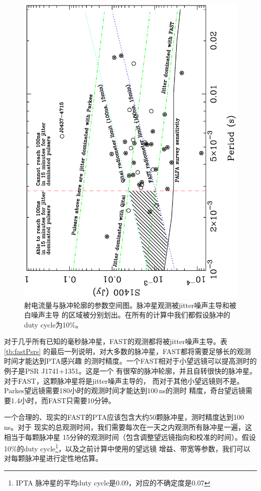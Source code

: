 \begin{figure}
\begin{center}
\includegraphics[angle=-90,width=12cm]{fastPsrsSelect.ps}
\caption{射电流量与脉冲轮廓的参数空间图。脉冲星观测被jitter噪声主导和被白噪声主导
的区域被分别划出。在所有的计算中我们都假设脉冲的duty cycle为10\%。} \label{fg:fastPsrsSelect}
\end{center}
\end{figure}

对于几乎所有已知的毫秒脉冲星，FAST的观测都将被jitter噪声主导。表\ref{tb:fastPsrs}
的最后一列说明，对大多数的脉冲星，FAST都将需要足够长的观测时间才能达到PTA感兴趣
的测时精度。一个FAST相对于小望远镜可以提高测时的例子是PSR J1741$+$1351。这是一个
有很窄的脉冲轮廓，并且自转很快的脉冲星。对于FAST，这颗脉冲星将是jitter噪声主导的，
而对于其他小望远镜则不是。Parkes望远镜需要180小时的观测时间才能达到100\,ns的测时
精度，奇台望远镜需要1.4小时，而FAST只需要10分钟。

一个合理的、现实的FAST的PTA应该包含大约50颗脉冲星，测时精度达到100\,ns。对于
现实的总观测时间，我们需要每次在一天之内观测所有脉冲星一遍，这相当于每颗脉冲星
15分钟的观测时间（包含调整望远镜指向和校准的时间）。假设10\%的duty cycle\footnote{IPTA
脉冲星的平均duty cycle是0.09，对应的不确定度是0.07}，以及之前计算中使用的望远镜
增益、带宽等参数，我们可以对每颗脉冲星进行定性地估算。

